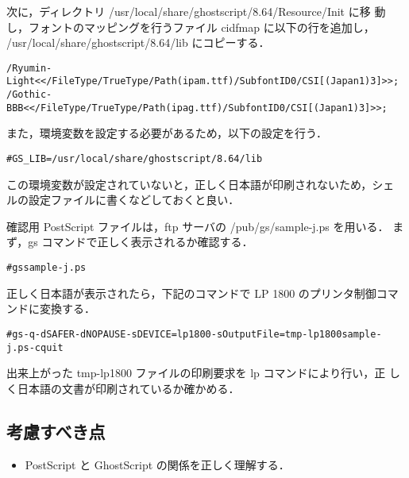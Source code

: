 次に，ディレクトリ /usr/local/share/ghostscript/8.64/Resource/Init に移
動し，フォントのマッピングを行うファイル cidfmap に以下の行を追加し，
/usr/local/share/ghostscript/8.64/lib にコピーする．

\begin{center}
\begin{breakbox}
\begin{alltt}
\small
/Ryumin-Light << /FileType /TrueType /Path (ipam.ttf) /SubfontID 0 /CSI [ (Japan1)  3 ] >> ;
/Gothic-BBB << /FileType /TrueType /Path (ipag.ttf) /SubfontID 0 /CSI [ (Japan1)  3 ] >> ;
\end{alltt}
\end{breakbox}
\end{center}

また，環境変数を設定する必要があるため，以下の設定を行う．
\begin{center}
\begin{breakbox}
\begin{alltt}
# GS_LIB=/usr/local/share/ghostscript/8.64/lib
\end{alltt}
\end{breakbox}
\end{center}
この環境変数が設定されていないと，正しく日本語が印刷されないため，シェ
ルの設定ファイルに書くなどしておくと良い．

確認用 PostScript ファイルは，ftp サーバの /pub/gs/sample-j.ps を用いる．
まず，gs コマンドで正しく表示されるか確認する．

\begin{center}
\begin{breakbox}
\begin{alltt}
# gs sample-j.ps
\end{alltt}
\end{breakbox}
\end{center}

正しく日本語が表示されたら，下記のコマンドで LP 1800 のプリンタ制御コマ
ンドに変換する．

\begin{center}
\begin{breakbox}
\begin{alltt}
# gs -q -dSAFER -dNOPAUSE -sDEVICE=lp1800 -sOutputFile=tmp-lp1800 sample-j.ps -c quit
\end{alltt}
\end{breakbox}
\end{center}

出来上がった tmp-lp1800 ファイルの印刷要求を lp コマンドにより行い，正
しく日本語の文書が印刷されているか確かめる．

\subsection*{考慮すべき点}
\begin{itemize}
\item PostScript と GhostScript の関係を正しく理解する．
\end{itemize}
